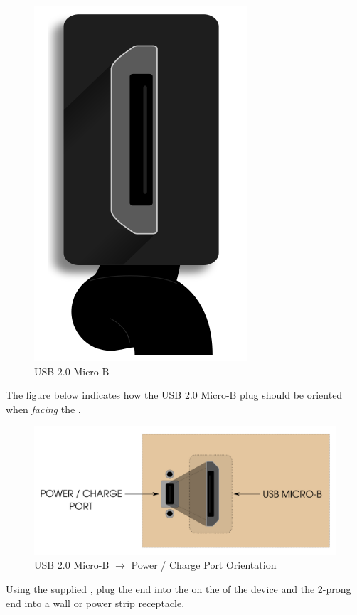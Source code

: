 \begin{figure}[H]
\centering
  \includegraphics{images/usb.png}
\caption{USB 2.0 Micro-B}
\end{figure}

The figure below indicates how the USB 2.0 Micro-B plug should be oriented when
\textit{facing} the \hyperref[Power Port]{}.

\begin{figure}[H]
\centering
  \includegraphics{images/usb_orientation.png}
\caption{USB 2.0 Micro-B $\longrightarrow$ Power / Charge Port Orientation}
\end{figure}

Using the supplied , plug the  end into the  on the
 of the device and the 2-prong end into a wall or power strip receptacle.


